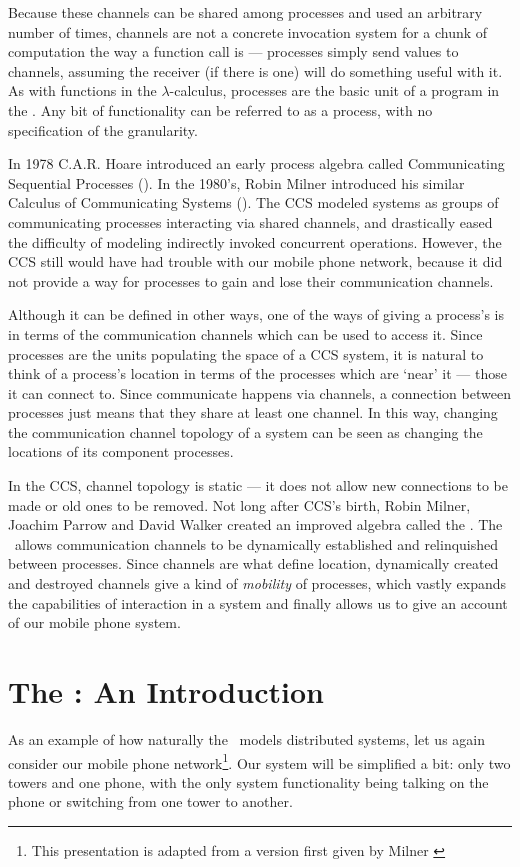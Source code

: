Because these channels can be shared among processes and used an arbitrary number of times, channels are not a concrete invocation system for a chunk of computation the way a function call is ---  processes simply send values to channels, assuming the receiver (if there is one) will do something useful with it.  
As with functions in the $\lambda$-calculus, processes are the basic unit of a program in the \picalc. 
Any bit of functionality can be referred to as a process, with no specification of the granularity.

In 1978 C.A.R. Hoare introduced an early process algebra called Communicating Sequential Processes (\!)\cite{hoar78}.  In the 1980's, Robin Milner introduced his similar Calculus of Communicating Systems (\!)\cite{miln82}.  
 The CCS modeled systems as groups of communicating processes interacting via shared channels, and drastically eased the difficulty of modeling indirectly invoked concurrent operations.  
However, the CCS still would have had trouble with our mobile phone network, because it did not provide a way for processes to gain and lose their communication channels.  

	Although it can be defined in other ways, one of the ways of giving a process's\emph{} is in terms of the communication channels which can be used to access it.  
Since processes are the units populating the space of a CCS system, it is natural to think of a process's location in terms of the processes which are `near' it ---  those it can connect to.  
Since communicate happens via channels, a connection between processes just means that they share at least one channel.  
In this way, changing the communication channel topology of a system can be seen as changing the locations of its component processes.  

	In the CCS, channel topology is static ---  it does not allow new connections to be made or old ones to be removed.  
Not long after CCS's birth, Robin Milner, Joachim Parrow and David Walker created an improved algebra called the \inidx{\picalc}.  
The \picalc\ allows communication channels to be dynamically established and relinquished between processes.  
Since channels are what define location, dynamically created and destroyed channels give a kind of \emph{mobility} of processes, which vastly expands the capabilities of interaction in a system and finally allows us to give an account of our mobile phone system.
\section{The \picalc: An Introduction}	
	As an example of how naturally the \picalc\ models distributed systems, let us again consider our mobile phone network\footnote{This presentation is adapted from a version first given by Milner \cite{miln99}}.  
Our system will be simplified a bit: only two towers and one phone, with the only system functionality being talking on the phone or switching from one tower to another.
	
